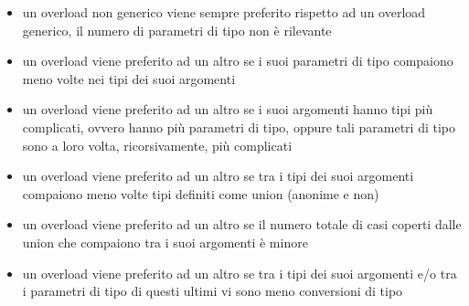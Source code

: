 \begin{itemize}
    \item{
        un overload non generico viene sempre preferito rispetto ad un overload generico, il 
        numero di parametri di tipo non è rilevante
    }
    \item{
        un overload viene preferito ad un altro se i suoi parametri di tipo compaiono 
        meno volte nei tipi dei suoi argomenti
    }
    \item{
        un overload viene preferito ad un altro se i suoi argomenti hanno tipi più complicati, 
        ovvero hanno più parametri di tipo, oppure tali parametri di tipo sono a loro volta, 
        ricorsivamente, più complicati
    }
    \item{
        un overload viene preferito ad un altro se tra i tipi dei suoi argomenti 
        compaiono meno volte tipi definiti come union (anonime e non)
    }
    \item{
        un overload viene preferito ad un altro se il numero totale di casi coperti dalle 
        union che compaiono tra i suoi argomenti è minore
    }
    \item{
        un overload viene preferito ad un altro se tra i tipi dei suoi argomenti e/o tra i 
        parametri di tipo di questi ultimi vi sono meno conversioni di tipo
    }
\end{itemize}